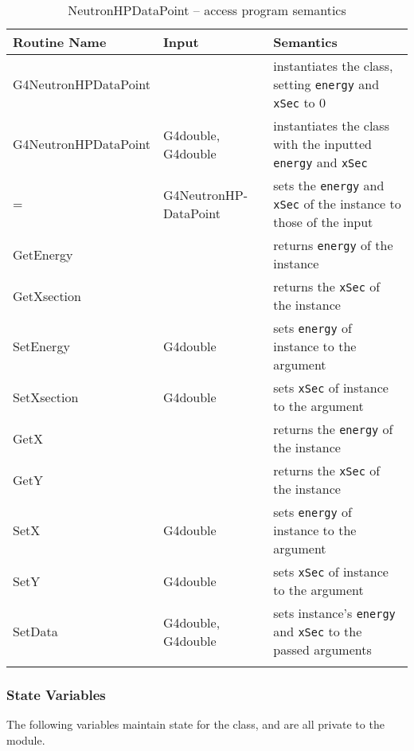 \documentclass[12pt]{article}
\begin{document}
\begin{table}[H]
\caption{NeutronHPDataPoint -- access program semantics}\label{Table_NeutronHPDataPointSemantics}
\begin{tabular}{l p{} p{}}
\toprule
\bf Routine Name & \bf Input & \bf Semantics \\\midrule
\arrayrulecolor{lightgray}
G4NeutronHPDataPoint  &                      & instantiates the class, setting \texttt{energy} and \texttt{xSec} to 0\\\hline
G4NeutronHPDataPoint  & G4double, G4double   & instantiates the class with the inputted \texttt{energy} and \texttt{xSec}\\\hline
=                     & G4NeutronHP-DataPoint& sets the \texttt{energy} and \texttt{xSec} of the instance to those of the input \\\hline
GetEnergy             &                      & returns \texttt{energy} of the instance \\\hline
GetXsection           &                      & returns the \texttt{xSec} of the instance\\\hline
SetEnergy             & G4double             & sets \texttt{energy} of instance to the argument\\\hline
SetXsection           & G4double             & sets \texttt{xSec} of instance to the argument\\\hline
GetX                  &                      & returns the \texttt{energy} of the instance\\\hline
GetY 				  &                      & returns the \texttt{xSec} of the instance\\\hline
SetX				  & G4double             & sets \texttt{energy} of instance to the argument\\\hline
SetY				  & G4double             & sets \texttt{xSec} of instance to the argument \\\hline
SetData				  & G4double, G4double   & sets instance's \texttt{energy} and \texttt{xSec} to the passed arguments\\
\arrayrulecolor{black}
\bottomrule
\end{tabular}
\end{table}

\subsubsection{State Variables}%
The following variables maintain state for the class, and are all private to the module.
\end{document}

